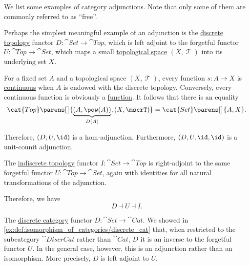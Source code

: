 \begin{example}\label{ex:def:category_adjunction}
  We list some examples of \hyperref[def:category_adjunction]{category adjunctions}. Note that only some of them are commonly referred to as \enquote{free}.

  \begin{thmenum}
     Perhaps the simplest meaningful example of an adjunction is the \hyperref[def:discrete_topology]{discrete topology} functor \( D: \cat{Set} \to \cat{Top} \), which is left adjoint to the forgetful functor \( U: \cat{Top} \to \cat{Set} \), which maps a small \hyperref[def:topological_space]{topological space} \( (X, \mscrT) \) into its underlying set \( X \).

    For a fixed set \( A \) and a topological space \( (X, \mscrT) \), every function \( s: A \to X \) is \hyperref[def:global_continuity]{continuous} when \( A \) is endowed with the discrete topology. Conversely, every continuous function is obviously a \hyperref[def:function]{function}. It follows that there is an equality
    \begin{equation*}
      \cat{Top}\parens[\big]{ \underbrace{(A, \pow(A))}_{D(A)}, (X, \mscrT) } = \cat{Set}\parens[\big]{ A, X }.
    \end{equation*}

    Therefore, \( (D, U, \id) \) is a hom-adjunction. Furthermore, \( (D, U, \id, \id) \) is a unit-counit adjunction.

     The \hyperref[def:indiscrete_topology]{indiscrete topology} functor \( I: \cat{Set} \to \cat{Top} \) is right-adjoint to the same forgetful functor \( U: \cat{Top} \to \cat{Set} \), again with identities for all natural transformations of the adjunction.

    Therefore, we have
    \begin{equation*}
      D \dashv U \dashv I.
    \end{equation*}

     The \hyperref[def:discrete_category]{discrete category} functor \( D: \cat{Set} \to \cat{Cat} \). We showed in \cref{ex:def:isomorphism_of_categories/discrete_cat} that, when restricted to the subcategory \( \cat{DiscrCat} \) rather than \( \cat{Cat} \), \( D \) it is an inverse to the forgetful functor \( U \). In the general case, however, this is an adjunction rather than an isomorphism. More precisely, \( D \) is left adjoint to \( U \).


\end{thmenum}
\end{example}
